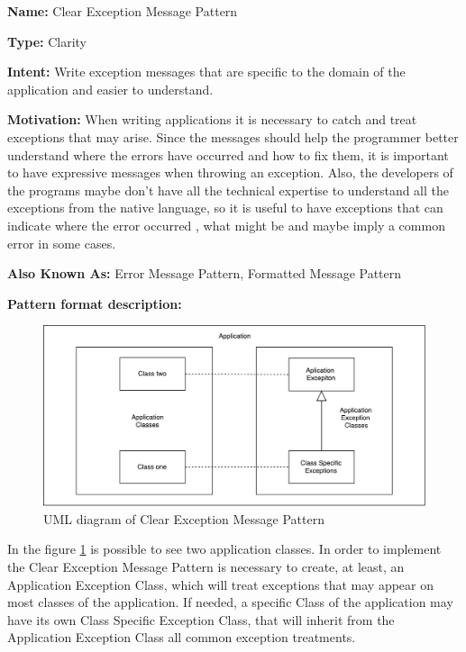 \documentclass[12pt]{article}
\begin{document}
\begin{flushleft}
\textbf{Name:} Clear Exception Message Pattern\newline

\textbf{Type:}  Clarity \newline

\textbf{Intent:} Write exception messages that are specific to the domain of the application and easier to understand.\newline

\textbf{Motivation:}
When writing applications it is necessary to catch and treat exceptions that may arise. Since the messages should help the programmer better understand where the errors have occurred and how to fix them, it is important to have expressive messages when throwing an exception. 
Also, the developers of the programs maybe don't have all the technical expertise to understand all the exceptions from the native language, so it is useful to have exceptions that can indicate where the error occurred , what might be and maybe imply a common error in some cases.\newline

\textbf{Also Known As:} Error Message Pattern, Formatted Message Pattern\newline

\textbf{Pattern format description:}

\begin{figure}[!htb]
\includegraphics[width=\textwidth]{diagrama.pdf}
\caption{UML diagram of Clear Exception Message Pattern}
\label{UML-diagram}
\end{figure}

In the figure \ref{UML-diagram} is possible to see two application classes. In order to implement the Clear Exception Message Pattern is necessary to create, at least, an Application Exception Class, which will treat exceptions that may appear on most classes of the application. If needed, a specific Class of the application may have its own Class Specific Exception Class, that will inherit from the Application Exception Class all common exception treatments. 


\end{flushleft}
\end{document}
